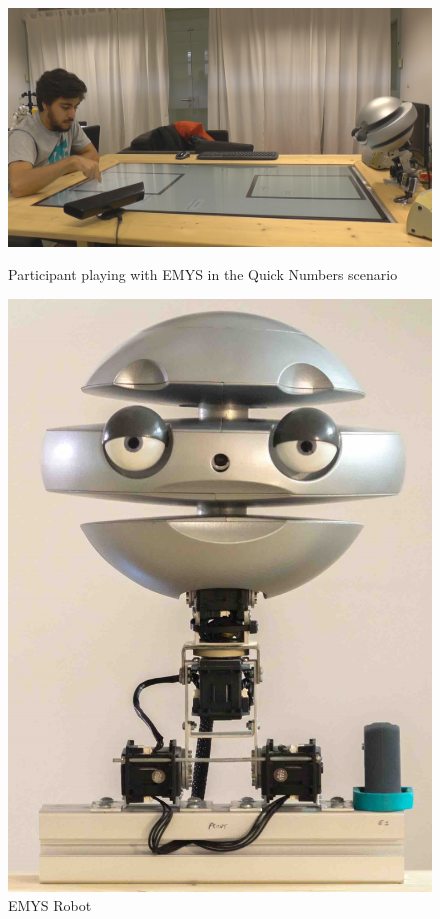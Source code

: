 \begin{figure}[h]
    \centering
    \begin{minipage}[b]{.60\textwidth}
        \centering
        \includegraphics[width=\textwidth]{figures/ScenarioScreenShot.png}
        \caption{Participant playing with \ac{EMYS} in the Quick Numbers scenario}
        \label{fig:ParticipantQuickNumbers}
    \end{minipage}
    \hfill
    \begin{minipage}[b]{.30\textwidth}
        \centering
        \includegraphics[width=\textwidth]{figures/emys.jpg}
        \caption{\ac{EMYS} Robot}
        \label{fig:EMYS}
    \end{minipage}
\end{figure}


